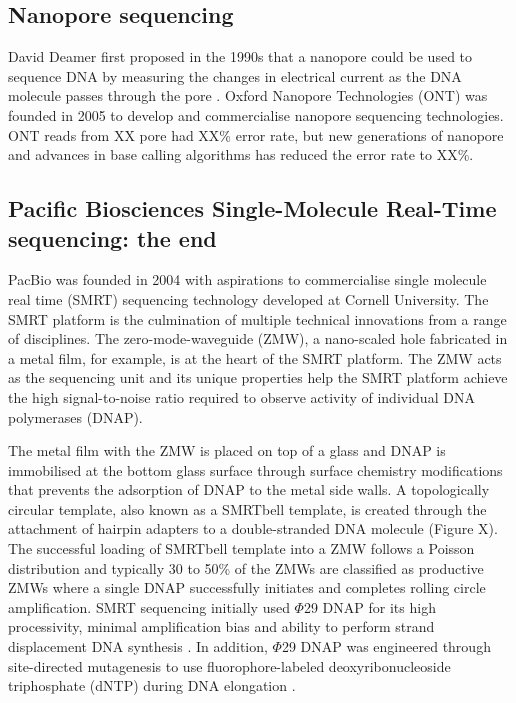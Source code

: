 \subsection{Nanopore sequencing}

David Deamer first proposed in the 1990s that a nanopore could be used to sequence DNA by measuring the changes in electrical current as the DNA molecule passes through the pore \cite{}. Oxford Nanopore Technologies (ONT) was founded in 2005 to develop and commercialise nanopore sequencing technologies. ONT reads from XX pore had XX\% error rate, but new generations of nanopore and advances in base calling algorithms has reduced the error rate to XX\%.

\subsection{Pacific Biosciences Single-Molecule Real-Time sequencing: the end}

PacBio was founded in 2004 with aspirations to commercialise single molecule real time (SMRT) sequencing technology developed at Cornell University. The SMRT platform is the culmination of multiple technical innovations from a range of disciplines. The zero-mode-waveguide (ZMW), a nano-scaled hole fabricated in a metal film, for example, is at the heart of the SMRT platform. The ZMW acts as the sequencing unit and its unique properties help the SMRT platform achieve the high signal-to-noise ratio required to observe activity of individual DNA polymerases (DNAP)\cite{Levene2003-og}. 

The metal film with the ZMW is placed on top of a glass and DNAP is immobilised at the bottom glass surface through surface chemistry modifications that prevents the adsorption of DNAP to the metal side walls\cite{Korlach2008-aq, Eid2009-ol}. A topologically circular template, also known as a SMRTbell template, is created through the attachment of hairpin adapters to a double-stranded DNA molecule (Figure X). The successful loading of SMRTbell template into a ZMW follows a Poisson distribution and typically 30 to 50\% of the ZMWs are classified as productive ZMWs where a single DNAP successfully initiates and completes rolling circle amplification. SMRT sequencing initially used $\Phi$29 DNAP for its high processivity, minimal amplification bias and ability to perform strand displacement DNA synthesis \cite{Eid2009-ol}. In addition, $\Phi$29 DNAP was engineered through site-directed mutagenesis to use fluorophore-labeled deoxyribonucleoside triphosphate (dNTP) during DNA elongation \cite{Korlach2008-fv,Eid2009-ol}. 

